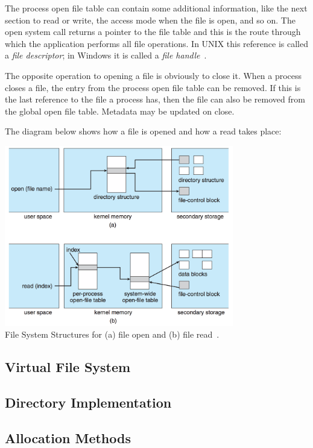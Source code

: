 The process open file table can contain some additional information, like the next section to read or write, the access mode when the file is open, and so on. The open system call returns a pointer to the file table and this is the route through which the application performs all file operations. In UNIX this reference is called a \textit{file descriptor}; in Windows it is called a \textit{file handle}~\cite{osc}.

The opposite operation to opening a file is obviously to close it. When a process closes a file, the entry from the process open file table can be removed. If this is the last reference to the file a process has, then the file can also be removed from the global open file table. Metadata may be updated on close.

The diagram below shows how a file is opened and how a read takes place:

\begin{center}
	\includegraphics[width=0.75\textwidth]{images/file-system-structures.png}\\
	File System Structures for (a) file open and (b) file read~\cite{osc}.
\end{center}

\subsection*{Virtual File System}

\subsection*{Directory Implementation}

\subsection*{Allocation Methods}






